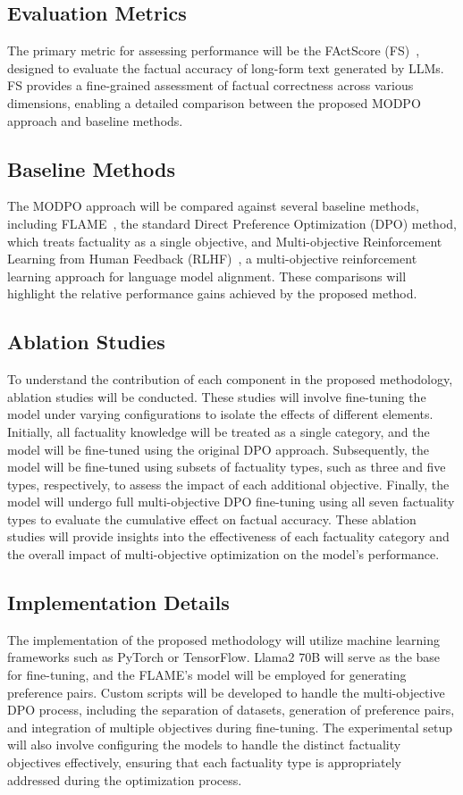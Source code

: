 \documentclass{article}
\begin{document}
\subsection{Evaluation Metrics}
The primary metric for assessing performance will be the FActScore (FS)~\cite{minFActScoreFinegrainedAtomic2023}, designed to evaluate the factual accuracy of long-form text generated by LLMs. FS provides a fine-grained assessment of factual correctness across various dimensions, enabling a detailed comparison between the proposed MODPO approach and baseline methods.

\subsection{Baseline Methods}
The MODPO approach will be compared against several baseline methods, including FLAME~\cite{lin_flame_2024}, the standard Direct Preference Optimization (DPO) method, which treats factuality as a single objective, and Multi-objective Reinforcement Learning from Human Feedback (RLHF)~\cite{OnePreferenceFitsAllAlignmentMultiObjectiveDirectPreference2024}, a multi-objective reinforcement learning approach for language model alignment. These comparisons will highlight the relative performance gains achieved by the proposed method.

\subsection{Ablation Studies}
To understand the contribution of each component in the proposed methodology, ablation studies will be conducted. These studies will involve fine-tuning the model under varying configurations to isolate the effects of different elements. Initially, all factuality knowledge will be treated as a single category, and the model will be fine-tuned using the original DPO approach. Subsequently, the model will be fine-tuned using subsets of factuality types, such as three and five types, respectively, to assess the impact of each additional objective. Finally, the model will undergo full multi-objective DPO fine-tuning using all seven factuality types to evaluate the cumulative effect on factual accuracy. These ablation studies will provide insights into the effectiveness of each factuality category and the overall impact of multi-objective optimization on the model's performance.

\subsection{Implementation Details}
The implementation of the proposed methodology will utilize machine learning frameworks such as PyTorch or TensorFlow. Llama2 70B will serve as the base for fine-tuning, and the FLAME's model will be employed for generating preference pairs. Custom scripts will be developed to handle the multi-objective DPO process, including the separation of datasets, generation of preference pairs, and integration of multiple objectives during fine-tuning. The experimental setup will also involve configuring the models to handle the distinct factuality objectives effectively, ensuring that each factuality type is appropriately addressed during the optimization process.
\end{document}
